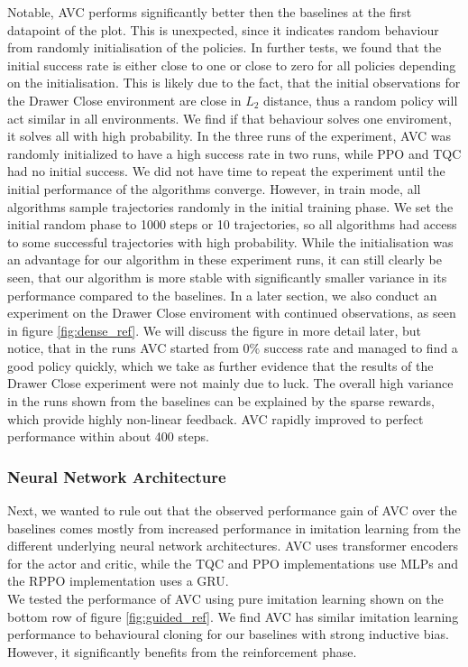 Notable, AVC performs significantly better then the baselines at the first datapoint of the plot. This is unexpected, since it indicates 
random behaviour from randomly initialisation of the policies. In further tests, we found that the initial success rate is either close to one or close to zero for all policies depending 
on the initialisation. This is likely 
due to the fact, that the initial observations for the Drawer Close environment are close in $L_2$ distance, thus a random policy will act similar in all environments. We find if that behaviour 
solves one enviroment, it solves all with high probability. In the three runs of the experiment, AVC was randomly initialized to have a high success rate in two runs, while PPO and TQC had no 
initial success. We did not have time to repeat the experiment until the initial performance of the algorithms converge. However, in train mode, 
all algorithms sample trajectories randomly in the initial training phase. 
We set the initial random phase to 1000 steps or 10 trajectories, so all algorithms had access to some successful trajectories with high probability. While the initialisation was an advantage 
for our algorithm in these experiment runs, it can still clearly be seen, that our algorithm is more stable with significantly smaller variance in its performance compared to the baselines. In a later 
section, we also conduct an experiment on the Drawer Close enviroment with continued observations, as seen in figure \ref{fig:dense_ref}. We will discuss the figure in more detail later, but 
notice, that in the runs AVC started from $0 \%$ success rate and managed to find a good policy quickly, which we take as further evidence that the results of the Drawer Close experiment were not 
mainly due to luck. The overall high variance in the runs shown from the baselines can be explained by the sparse rewards, which provide highly non-linear feedback. 
AVC rapidly improved to perfect performance within about 400 steps. \\

\subsubsection{Neural Network Architecture}
Next, we wanted to rule out that the observed performance gain of AVC over the baselines comes mostly from increased performance in imitation learning 
from the different underlying neural network architectures. AVC uses transformer encoders for the actor and 
critic, while the TQC and PPO implementations use MLPs and the RPPO implementation uses a GRU.\\ 
We tested the performance of AVC using pure imitation learning shown on the bottom row of
figure \ref{fig:guided_ref}. We find AVC has similar imitation learning performance to behavioural cloning for our baselines with strong inductive bias. However, it significantly benefits from the reinforcement phase.\\

